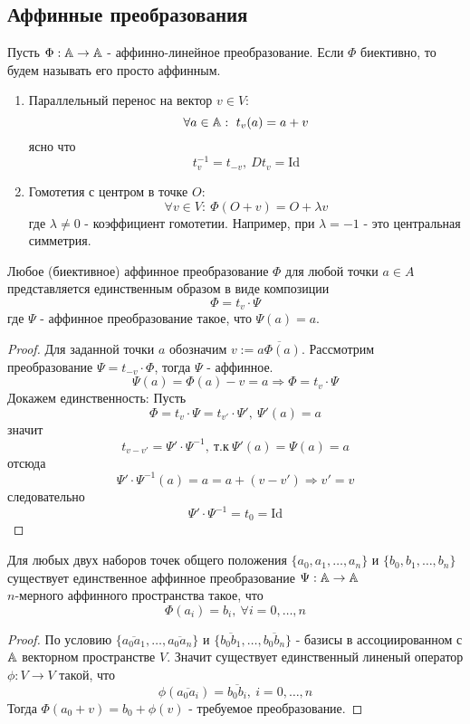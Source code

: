 \subsection*{Аффинные преобразования}
\begin{definition}
    Пусть $\Phi:\mathbb{A}\to \mathbb{A}$ - аффинно-линейное преобразование. Если $\Phi$ биективно, то будем называть его просто аффинным.
\end{definition} 
\begin{example}
    \begin{enumerate}
        \item Параллельный перенос на вектор $v\in V$:
        \[\forall a\in \mathbb{A}:\ t_v(a)=a+v\]
        ясно что 
        \[t^{-1}_v=t_{-v},\ Dt_v=\text{Id}\]
        \item Гомотетия с центром в точке $O$:
        \[\forall v\in V:\ \Phi(O+v)=O+\lambda v\]
        где $\lambda\ne 0$ - коэффициент гомотетии.
        Например, при $\lambda=-1$ - это центральная симметрия.
    \end{enumerate}
\end{example}
\begin{theorem}
    Любое (биективное) аффинное преобразование $\Phi$ для любой точки $a\in A$ представляется единственным образом в виде композиции 
    \[\Phi=t_v\cdot \Psi\]
    где $\Psi$ - аффинное преобразование такое, что $\Psi(a)=a$. 
\end{theorem} 
\begin{proof}
    Для заданной точки $a$ обозначим $v:=\overline{a\Phi(a)}$. Рассмотрим преобразование $\Psi = t_{-v}\cdot \Phi$, тогда $\Psi$ - аффинное.
    \[\Psi(a)=\Phi(a)-v=a \Longrightarrow \Phi=t_v\cdot \Psi\]
    Докажем единственность: Пусть 
    \[\Phi=t_v\cdot \Psi=t_{v'}\cdot \Psi',\ \Psi'(a)=a\]
    значит
    \[t_{v-v'}=\Psi'\cdot\Psi^{-1},\ \text{т.к}\ \Psi'(a)=\Psi(a)=a\]
    отсюда
    \[\Psi'\cdot \Psi^{-1}(a)=a=a+(v-v') \Longrightarrow v'=v\]
    следовательно
    \[\Psi'\cdot\Psi^{-1}=t_0=\text{Id}\]
\end{proof} 
\begin{theorem}
    Для любых двух наборов точек общего положения $\{a_0, a_1,\dots,a_n\}$ и $\{b_0,b_1,\dots,b_n\}$ существует единственное аффинное преобразование $\Psi: \mathbb{A}\to \mathbb{A}$\\
    $n$-мерного аффинного пространства такое, что
    \[\Phi(a_i)=b_i,\ \forall i=0,\dots,n\]
\end{theorem} 
\begin{proof}
    По условию $\{\overline{a_0a_1},\dots,\overline{a_0a_n}\}$ и $\{\overline{b_0b_1},\dots,\overline{b_0b_n}\}$ - базисы в ассоциированном с $\mathbb{A}$ векторном пространстве $V$. Значит существует единственный линеный оператор $\phi: V\to V$ такой, что
    \[\phi(\overline{a_0a_i})=\overline{b_0b_i},\ i=0,\dots, n\]
    Тогда $\Phi(a_0+v)=b_0+\phi(v)$ - требуемое преобразование.
\end{proof} 
